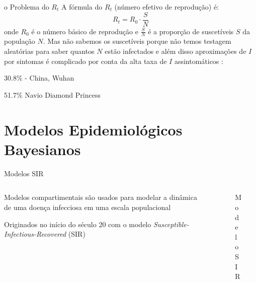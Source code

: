 \documentclass[aspectratio=169]{beamer}                    %
\begin{document}
\begin{frame}{o Problema do $R_t$}
    A fórmula do $R_t$ (número efetivo de reprodução) é:
    $$R_t = R_0 \cdot \frac{S}{N}$$
    \vfill
    onde $R_0$ é o número básico de reprodução e $\frac{S}{N}$ é a proporção de suscetíveis $S$ da população $N$.
    \vfill
    Mas não sabemos os suscetíveis porque não temos testagem aleatórias para saber quantos $N$ estão infectados e além disso aproximações de $I$ por sintomas é complicado por conta da alta taxa de $I$ assintomáticos \parencite{gaoSystematicReviewAsymptomatic2021}:
    \begin{vfilleditems}
        \item 30.8\% - China, Wuhan \parencite{nishiura2020estimation}
        \item 51.7\% Navio Diamond Princess \parencite{mizumoto2020estimating}
    \end{vfilleditems}
\end{frame}

\section{Modelos Epidemiológicos Bayesianos}
\begin{frame}{Modelos SIR}
    \begin{columns}
        \begin{column}{0.5\textwidth}
            \begin{vfilleditems}
                \item Modelos compartimentais são usados para modelar a dinâmica de uma doença infecciosa em uma escala populacional
                \item Originados no início do século 20 com o modelo \textit{Susceptible-Infectious-Recovered} (SIR) \parencite{kermack1927contribution}
            \end{vfilleditems}
        \end{column}
        \begin{column}{0.5\textwidth}
            \begin{figure}
                \centering
                \label{fig:SIR}
                \caption{Modelo SIR}
            \end{figure}
        \end{column}
    \end{columns}
\end{frame}
\end{document}
